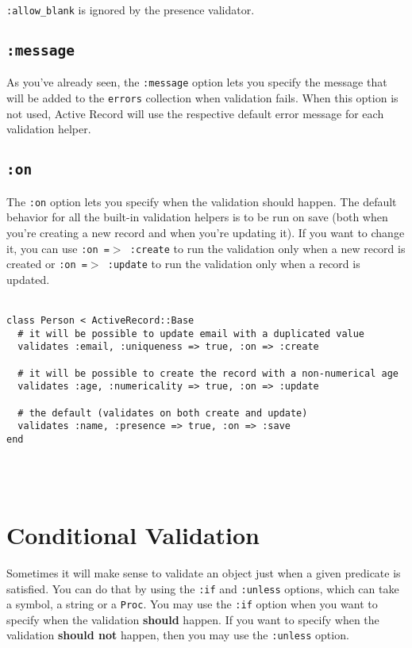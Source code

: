 \documentclass[10pt]{book}
\begin{document}
\texttt{:allow\_blank} is ignored by the presence validator.

\subsection{ \texttt{:message}}

As you’ve already seen, the \texttt{:message} option lets you specify the message that will be added to the \texttt{errors}  collection when validation fails. When this option is not used, Active  Record will use the respective default error message for each validation  helper.

\subsection{ \texttt{:on}}

The \texttt{:on} option lets you specify when the validation should  happen. The default behavior for all the built-in validation helpers is  to be run on save (both when you’re creating a new record and when  you’re updating it). If you want to change it, you can use \texttt{:on =$>$ :create} to run the validation only when a new record is created or \texttt{:on =$>$ :update} to run the validation only when a record is updated.
\\ \\
\begin{minipage}{\textwidth}{\scriptsize
\begin{verbatim}
class Person < ActiveRecord::Base
  # it will be possible to update email with a duplicated value
  validates :email, :uniqueness => true, :on => :create
 
  # it will be possible to create the record with a non-numerical age
  validates :age, :numericality => true, :on => :update
 
  # the default (validates on both create and update)
  validates :name, :presence => true, :on => :save
end
\end{verbatim}}
\end{minipage}
\\ \\

\section{ Conditional Validation}

Sometimes it will make sense to validate an object just when a given predicate is satisfied. You can do that by using the \texttt{:if} and \texttt{:unless} options, which can take a symbol, a string or a \texttt{Proc}. You may use the \texttt{:if} option when you want to specify when the validation \textbf{should} happen. If you want to specify when the validation \textbf{should not} happen, then you may use the \texttt{:unless} option.
\end{document}
